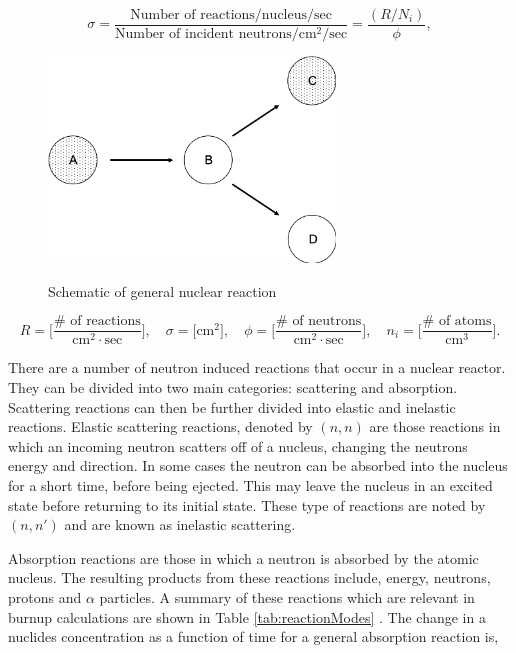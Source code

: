 \begin{equation}
    \sigma = \frac{\text{Number of reactions} / \text{nucleus} / \text{sec}}{\text{Number of incident neutrons} / \text{cm}^{2} / \text{sec}} = \frac{(R/N_{i})}{\phi},
\end{equation}

\clearpage

\begin{figure}[b]
  \centering
  \includegraphics[width=3.0in]{images/chapter-2/nuclearReaction.png}\\
  \caption{Schematic of general nuclear reaction}
  \label{fig:nuclearReaction}
\end{figure} 

\clearpage

\begin{equation*}
    R = \bigg[\frac{\# \text{ of reactions}}{\text{cm}^{2}\cdot \text{sec}}\bigg], \quad \sigma = \big[\text{cm}^{2}\big], \quad \phi = \bigg[\frac{\# \text{ of neutrons}}{\text{cm}^{2}\cdot \text{sec}} \bigg], \quad n_{i} = \bigg[\frac{\# \text{ of atoms}}{\text{cm}^{3}}\bigg].
\end{equation*}

There are a number of neutron induced reactions that occur in a nuclear reactor. They can be divided into two main categories: scattering and absorption. Scattering reactions can then be further divided into elastic and inelastic reactions. Elastic scattering reactions, denoted by $(n,n)$ are those reactions in which an incoming neutron scatters off of a nucleus, changing the neutrons energy and direction. In some cases the neutron can be absorbed into the nucleus for a short time, before being ejected. This may leave the nucleus in an excited state before returning to its initial state. These type of reactions are noted by $(n,n')$ and are known as inelastic scattering. 

Absorption reactions are those in which a neutron is absorbed by the atomic nucleus. The resulting products from these reactions include, energy, neutrons, protons and $\alpha$ particles. A summary of these reactions which are relevant in burnup calculations are shown in Table \ref{tab:reactionModes} \cite{pusaThesis}. The change in a nuclides concentration as a function of time for a general absorption reaction is,

